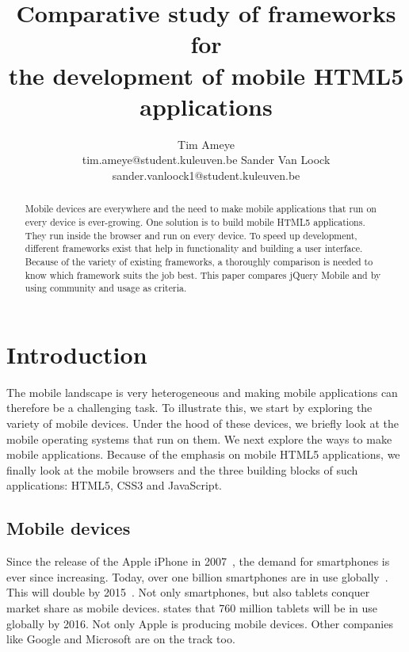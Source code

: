 \documentclass[a4paper]{artikel3}
\title{Comparative study of frameworks for \\ the development of mobile HTML5 applications}
\author{Tim Ameye \\ tim.ameye@student.kuleuven.be \And Sander Van Loock \\ sander.vanloock1@student.kuleuven.be}
\begin{document}
\maketitle

\begin{abstract}
Mobile devices are everywhere and the need to make mobile applications that run on every device is ever-growing.
One solution is to build mobile HTML5 applications.
They run inside the browser and run on every device.
To speed up development, different frameworks exist that help in functionality and building a user interface.
Because of the variety of existing frameworks, a thoroughly comparison is needed to know which framework suits the job best.
This paper compares jQuery Mobile and \st{} by using community and usage as criteria.
\end{abstract}


\section{Introduction} %
\label{sec:introduction}
The mobile landscape is very heterogeneous and making mobile applications can therefore be a challenging task.
To illustrate this, we start by exploring the variety of mobile devices.
Under the hood of these devices, we briefly look at the mobile operating systems that run on them. 
We next explore the ways to make mobile applications.
Because of the emphasis on mobile HTML5 applications, we finally look at the mobile browsers and the three building blocks of such applications: HTML5, CSS3 and JavaScript.

\subsection{Mobile devices}
Since the release of the Apple iPhone in 2007~\cite{David2011}, the demand for smartphones is ever since increasing. 
Today, over one billion smartphones are in use globally~\cite{Yang2012}.
This will double by 2015~\cite{Gillett2012}.
Not only smartphones, but also tablets conquer market share as mobile devices.
\cite{Gillett2012} states that 760 million tablets will be in use globally by 2016.
Not only Apple is producing mobile devices.
Other companies like Google and Microsoft are on the track too.
\end{document}
